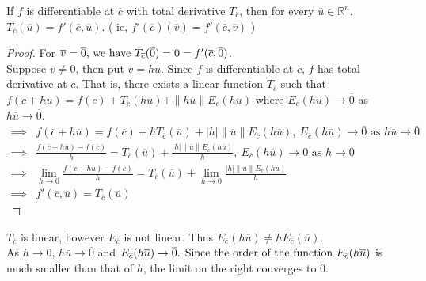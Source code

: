 \begin{theorem}
	If $f$ is differentiable at $\overline{c}$ with total derivative $T_{\overline{c}}$, then for every $\overline{u} \in \mathbb{R}^n$, $T_{\overline{c}}(\overline{u}) = f'(\overline{c},\overline{u})$. ( ie, \( f'(\overline{c})(\overline{v}) = f'(\overline{c},\overline{v}) \) )
\end{theorem}
\begin{proof}
	For \( \overline{v} = \overline{0}$, we have $T_{\overline{c}}(\overline{0}) = 0 = f'(\overline{c},\overline{0}) \).\\

	Suppose \( \overline{v} \ne \overline{0} \), then put \( \overline{v} = h\overline{u} \). Since $f$ is differentiable at $\overline{c}$, $f$ has total derivative at $\overline{c}$. That is, there exists a linear function $T_{\overline{c}}$ such that \( f(\overline{c}+h\overline{u}) = f(\overline{c}) + T_{\overline{c}}(h\overline{u}) + \|h\overline{u}\|E_{\overline{c}} (h\overline{u}) \) where $E_{\overline{c}}(h\overline{u}) \to \overline{0}$ as $h\overline{u} \to \overline{0}$.
	\begin{align*}
		\implies  & f(\overline{c}+h\overline{u}) = f(\overline{c}) + hT_{\overline{c}}(\overline{u}) + |h|\|\overline{u}\|E_{\overline{c}} (h\overline{u}),\ E_{\overline{c}}(h\overline{u}) \to \overline{0} \text{ as } h\overline{u} \to \overline{0} \\
		\implies  & \frac{f(\overline{c}+h\overline{u}) - f(\overline{c})}{h} = T_{\overline{c}}(\overline{u}) + \frac{|h|\|\overline{u}\|E_{\overline{c}}(h\overline{u})}{h},\  E_{\overline{c}}(h\overline{u}) \to \overline{0} \text{ as } h \to 0 \\
		\implies  & \lim_{h \to 0} \frac{f(\overline{c}+h\overline{u}) - f(\overline{c})}{h} = T_{\overline{c}}(\overline{u}) + \lim_{h \to 0} \frac{|h|\|\overline{u}\|E_{\overline{c}}(h\overline{u})}{h} \\
		\implies & f'(\overline{c},\overline{u}) = T_{\overline{c}}(\overline{u})
	\end{align*}
\end{proof}

\begin{note}
	$T_{\overline{c}}$ is linear, however $E_{\overline{c}}$ is not linear. Thus $E_{\overline{c}}(h\overline{u}) \ne h E_{\overline{c}} (\overline{u})$.\\

	As $h \to 0$, $h\overline{u} \to \overline{0}$ and \( E_{\overline{c}}(h\overline{u}) \to \overline{0}$. Since the order of the function \( E_{\overline{c}}(h\overline{u}) \) is much smaller than that of $h$, the limit on the right converges to 0.
\end{note}

